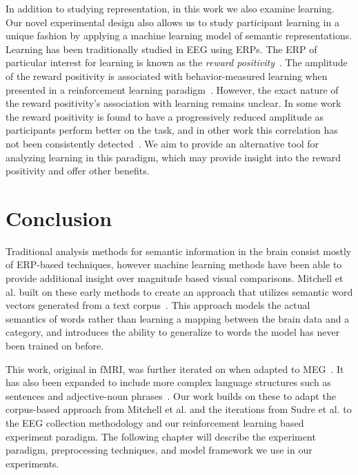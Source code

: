 In addition to studying representation, in this work we also examine learning. 
Our novel experimental design also allows us to study participant learning in a 
unique fashion by applying a machine learning model of semantic 
representations. Learning has been traditionally studied in EEG using ERPs. The 
ERP of particular interest for learning is known as the \emph{reward 
positivity}~\cite{proudfit2015reward}. The amplitude of the reward positivity 
is associated with behavior-measured learning when presented in a reinforcement 
learning paradigm~\cite{holroyd2002neural, sutton1998reinforcement, 
williams2017application}. However, the exact nature of the reward positivity's 
association with learning remains unclear. In some work the reward positivity 
is found to have a progressively reduced amplitude as participants perform 
better on the task, and in other work this correlation has not been 
consistently detected~\cite{walsh2012learning}. We aim to provide an 
alternative tool for analyzing learning in this paradigm, which may provide 
insight into the reward positivity and offer other benefits.

\section{Conclusion}

Traditional analysis methods for semantic information in the brain consist 
mostly of ERP-based techniques, however machine learning methods have been able 
to provide additional insight over magnitude based visual comparisons. Mitchell 
et al. built on these early methods to create an approach that utilizes 
semantic word vectors generated from a text corpus~\cite{Mitchell2008}. This 
approach models the actual semantics of words rather than learning a mapping 
between the brain data and a category, and introduces the ability to generalize 
to words the model has never been trained on before. 

This work, original in fMRI, was further iterated on when adapted to 
MEG~\cite{Sudre2012}. It has also been expanded to include more complex 
language structures such as sentences and adjective-noun 
phrases~\cite{pereira2018toward, afyshethesis}. Our work builds on these to 
adapt the corpus-based approach from Mitchell et al. and the iterations from 
Sudre et al.  to the EEG collection methodology and our reinforcement learning 
based experiment paradigm. The following chapter will describe the experiment 
paradigm, preprocessing techniques, and model framework we use in our 
experiments.
